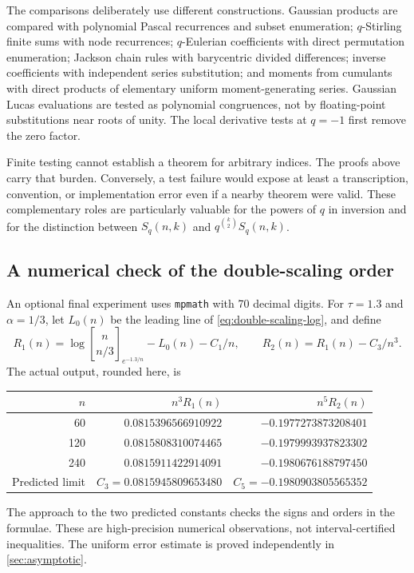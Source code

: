 \documentclass[11pt,a4paper]{article}
\numberwithin{equation}{section}
\theoremstyle{definition}
\theoremstyle{remark}
\newcommand{\Gb}[3]{\genfrac{[}{]}{0pt}{}{#1}{#2}_{#3}}
\begin{document}
The comparisons deliberately use different constructions. Gaussian
products are compared with polynomial Pascal recurrences and subset
enumeration; $q$-Stirling finite sums with node recurrences;
$q$-Eulerian coefficients with direct permutation enumeration;
Jackson chain rules with barycentric divided differences; inverse
coefficients with independent series substitution; and moments from
cumulants with direct products of elementary uniform moment-generating
series. Gaussian Lucas evaluations are tested as polynomial
congruences, not by floating-point substitutions near roots of unity.
The local derivative tests at $q=-1$ first remove the zero factor.

Finite testing cannot establish a theorem for arbitrary indices. The
proofs above carry that burden. Conversely, a test failure would expose
at least a transcription, convention, or implementation error even if a
nearby theorem were valid. These complementary roles are particularly
valuable for the powers of $q$ in inversion and for the distinction
between $S_q(n,k)$ and $q^{\binom k2}S_q(n,k)$.

\subsection{A numerical check of the double-scaling order}
An optional final experiment uses \texttt{mpmath} with 70 decimal
digits. For $\tau=1.3$ and $\alpha=1/3$, let $L_0(n)$ be the leading
line of \cref{eq:double-scaling-log}, and define
\[
 R_1(n)=\log\Gb n{n/3}{e^{-1.3/n}}-L_0(n)-C_1/n,
 \qquad R_2(n)=R_1(n)-C_3/n^3.
\]
The actual output, rounded here, is
\begin{center}
\begin{tabular}{@{}rrr@{}}
\toprule
$n$ & $n^3R_1(n)$ & $n^5R_2(n)$\\
\midrule
60  & $0.0815396566910922$ & $-0.1977273873208401$\\
120 & $0.0815808310074465$ & $-0.1979993937823302$\\
240 & $0.0815911422914091$ & $-0.1980676188797450$\\
\midrule
Predicted limit & $C_3=0.0815945809653480$ & $C_5=-0.1980903805565352$\\
\bottomrule
\end{tabular}
\end{center}
The approach to the two predicted constants checks the signs and
orders in the formulae. These are high-precision numerical observations,
not interval-certified inequalities. The uniform error estimate is
proved independently in \cref{sec:asymptotic}.
\end{document}
